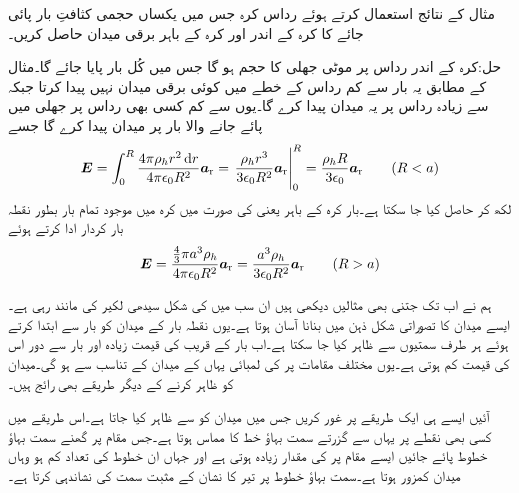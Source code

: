 مثال  کے نتائج استعمال کرتے ہوئے   رداس کرہ جس میں یکساں  حجمی کثافتِ بار پائی جائے کا کرہ کے اندر اور کرہ کے باہر برقی میدان  حاصل کریں۔

حل:کرہ کے اندر رداس  پر  موٹی جھلی کا حجم  ہو گا جس میں کُل  بار پایا جائے گا۔مثال   کے مطابق یہ بار  سے کم رداس کے خطے میں کوئی برقی میدان نہیں پیدا کرتا جبکہ  سے زیادہ رداس پر یہ میدان پیدا کرے گا۔یوں  سے کم کسی بھی رداس پر جھلی میں پائے جانے والا بار  پر میدان پیدا کرے گا جسے
\begin{align}
\kvec{E}=\int_0^{R} \frac{4\pi \rho_h r^2 \dif r}{4\pi \epsilon_0 R^2} \ar=\left. \frac{\rho_h r^3}{3\epsilon_0 R^2} \ar\right|_0^R=\frac{\rho_h R}{3\epsilon_0}\ar \quad \quad (R<a)
\end{align}
لکھ کر حاصل کیا جا سکتا ہے۔بار کرہ کے باہر یعنی  کی صورت میں کرہ میں موجود تمام بار بطور نقطہ بار کردار ادا کرتے ہوئے
\begin{align}
{\ensuremath{{\boldsymbol{E}}}}=\frac{\frac{4}{3} \pi a^3 \rho_h}{4\pi \epsilon_0 R^2}{\boldsymbol{a}}_{\textup{r}}=\frac{ a^3 \rho_h}{3\epsilon_0 R^2}{\boldsymbol{a}}_{\textup{r}}  \quad \quad (R>a)
\end{align}

ہم نے اب تک جتنی بھی مثالیں دیکھی ہیں ان سب میں  کی شکل سیدھی لکیر کی مانند رہی ہے۔ایسے میدان کا تصوراتی شکل ذہن میں بنانا آسان ہوتا ہے۔یوں نقطہ بار کے میدان کو بار سے ابتدا کرتے ہوئے ہر طرف سمتیوں سے ظاہر کیا جا سکتا ہے۔اب بار کے قریب  کی قیمت زیادہ اور بار سے دور اس کی قیمت کم ہوتی ہے۔یوں مختلف مقامات پر  کی لمبائی یہاں کے میدان کے  تناسب سے ہو گی۔میدان کو ظاہر کرنے کے دیگر طریقے بھی رائج ہیں۔

آئیں ایسے ہی ایک طریقے پر غور کریں جس میں میدان کو  سے ظاہر کیا جاتا ہے۔اس طریقے میں کسی بھی نقطے  پر  یہاں سے گزرتے سمت بہاؤ خط کا مماس ہوتا ہے۔جس مقام پر گھنے سمت بہاؤ خطوط  پائے جائیں ایسے مقام پر  کی مقدار زیادہ ہوتی ہے اور جہاں ان خطوط کی تعداد کم ہو وہاں میدان کمزور ہوتا ہے۔سمت بہاؤ خطوط پر تیر کا نشان  کے مثبت سمت کی نشاندہی کرتا ہے۔
 
